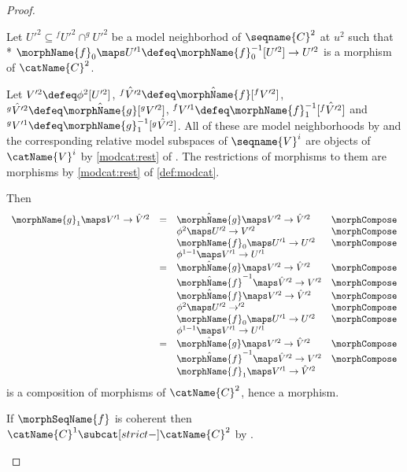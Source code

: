 \documentclass{article}
\begin{document}
\begin{lemma}
\begin{proof}
\begin{description}
Let $U'^2 \subseteq {}^f\!U'^2 \cap ^{g}U'^2$ be a model neighborhod of
$\seqname{C}^2$ at $u^2$ such that \\*
$\morphName{f}_0 \maps U'^1 \defeq \morphName{f}_0^{-1}[U'^2] \to U'^2$ is
a morphism of $\catName{C}^2$.

Let $V'^2 \defeq \phi^2[U'^2]$,
$\hat{^{f}V'^2} \defeq \hat{\morphName{f}}[^{f}V'^2]$,
$\hat{^{g}V'^2} \defeq \hat{\morphName{g}}[^{g}V'^2]$,
$^{f}V'^1 \defeq \morphName{f}_1^{-1}[\hat{^{f}V'^2}]$ and
$^{g}V'^1 \defeq \morphName{g}_1^{-1}[\hat{^{g}V'^2}]$.
All of these are model neighborhoods by  and the
corresponding relative model subspaces of $\seqname{V}^i$ are objects of
$\catName{V}^i$ by
{
  \showlabelsinline
  \cref{modcat:rest}
}
of . The restrictions of morphisms to them are
morphisms by
{
  \showlabelsinline
  \cref{modcat:rest}
}
of \cref{def:modcat}.

Then
\begin{equation*}
\begin{array} {llll}
  \morphName{g}_1 \maps V'^1 \to \hat{V}'^2
  & =
  & \hat{\morphName{g}} \maps V'^2 \to \hat{V}'^2
  & \morphCompose
\\*
  &
  & \phi^2 \maps U'^2 \to V'^2
  & \morphCompose
\\*
  &
  & \morphName{f}_0 \maps U'^1 \to U'^2
  & \morphCompose
\\*
  &
  & \phi^{1-1} \maps V'^1 \to U'^1
\\*
  & =
  & \hat{\morphName{g}} \maps  V'^2 \to \hat{V}'^2
  & \morphCompose
\\*
  &
  & \hat{\morphName{f}}^{-1} \maps  \hat{V}'^2 \to  V'^2
  & \morphCompose
\\*
  &
  & \hat{\morphName{f}} \maps V'^2 \to \hat{V}'^2
  & \morphCompose
\\*
  &
  & \phi^2 \maps  U'^2 \to '^2
  & \morphCompose
\\*
  &
  & \morphName{f}_0 \maps U'^1 \to U'^2
  & \morphCompose
\\*
  &
  & \phi^{1-1} \maps V'^1 \to U'^1
\\*
  & =
  & \hat{\morphName{g}} \maps  V'^2 \to \hat{V}'^2
  & \morphCompose
\\*
  &
  & \hat{\morphName{f}}^{-1} \maps  \hat{V}'^2 \to  V'^2
  & \morphCompose
\\*
  &
  & \morphName{f}_1 \maps V'^1 \to \hat{V}'^2
\end{array}
\end{equation*}
is a composition of morphisms of $\catName{C}^2$, hence a morphism.

If $\morphSeqName{f}$ is coherent then
$\catName{C}^1 \subcat[strict-] \catName{C}^2$ by
.
\end{description}
\end{proof}
\end{lemma}
\end{document}
